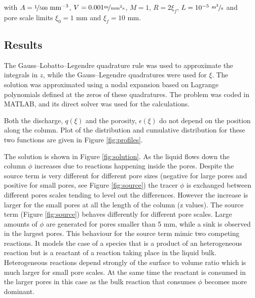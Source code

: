 \documentclass{CFD2011}
\newcommand{\TODO}[1]{\textcolor{blue}{TODO: #1} \\}
\newcommand{\newf}[1]{#1}
\begin{document}
\noindent \newf{with $A=\nicefrac{1}{500}~\text{mm}^{-3}$, $V=0.001 \nicefrac{\text{m}}{\text{mm}^2 \text{s}}$, $M=1$, $R=2\xi_f$, $L=10^{-5}~\nicefrac{\text{m}^2}{\text{s}}$ and pore scale limits $\xi_0=1$ mm and $\xi_f=10$ mm.}

\subsection{Results}
The Gauss--Lobatto--Legendre quadrature rule was used to approximate the integrals in $z$, while the Gauss--Legendre quadratures were used for $\xi$. The solution was approximated using a nodal expansion based on Lagrange polynomials defined at the zeros of these quadratures. The problem was coded in {MATLAB}, and its direct solver was used for the calculations.


Both the discharge, $q({\xi})$ and the porosity, $\epsilon({\xi})$ do not depend on the position along the column. Plot of the distribution and cumulative distribution for these two functions are given in Figure \ref{fig:profiles}.



The solution is shown in Figure \ref{fig:solution}. As the liquid flows down the column $\phi$ increases due to reactions happening inside the pores. Despite the source term is very different for different pore sizes (negative for large pores and positive for small pores, see Figure \ref{fig:source}) the tracer $\phi$ is exchanged between different pores scales tending to level out the differences. However the increase is larger for the small pores at all the length of the column (z values). The source term (Figure \ref{fig:source}) behaves differently for different pore scales. Large amounts of $\phi$ are generated for pores smaller than 5 mm, while a sink is observed in the largest pores. This behaviour for the source term mimic two competing reactions. It models the case of a species that is a product of an heterogeneous reaction but is a reactant of a reaction taking place in the liquid bulk. Heterogeneous reactions depend strongly of the surface to volume ratio which is much larger for small pore scales. At the same time the reactant is consumed in the larger pores in this case as the bulk reaction that consumes $\phi$ becomes more dominant.
\end{document}
